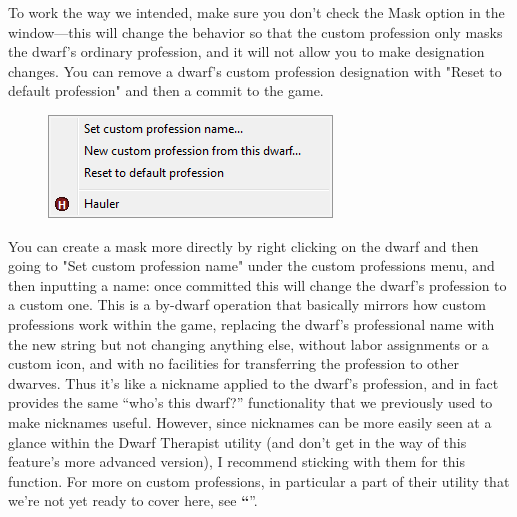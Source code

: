 \documentclass[]{article}
\newcommand{\jump}[1] {\textbf{``\nameref{sec:#1}}''}
\begin{document}
To work the way we intended, make sure you don't check the Mask option in the window---this will change
the behavior so that the custom profession only masks the dwarf's ordinary profession, and it will not
allow you to make designation changes. You can remove a dwarf's custom profession designation with "Reset
to default profession" and then a commit to the game.

\begin{figure}
\vspace{-10pt}
  \begin{center}
    \includegraphics[width=\linewidth]{Sec3Fig11}
  \end{center}
\vspace{-10pt}
\end{figure}
You can create a mask more directly by right clicking on the dwarf and then going to "Set custom
profession name" under the custom professions menu, and then inputting a name: once committed this will
change the dwarf's profession to a custom one. This is a by-dwarf operation that basically mirrors how
custom professions work within the game, replacing the dwarf's professional name with the new string but
not changing anything else, without labor assignments or a custom icon, and with no facilities for
transferring the profession to other dwarves. Thus it's like a nickname applied to the dwarf's
profession, and in fact provides the same ``who's this dwarf?'' functionality that we previously used to
make nicknames useful. However, since nicknames can be more easily seen at a glance within the Dwarf
Therapist utility (and don't get in the way of this feature's more advanced version), I recommend
sticking with them for this function. For more on custom professions, in particular a part of
their utility that we're not yet ready to cover here, see \jump{Super Labors}.
\end{document}
